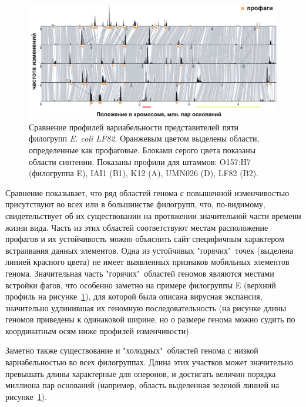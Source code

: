 \begin{figure}[!ht] 
    \center
      \includegraphics[width=\textwidth]{Dissertation/images/complexity/coli_phylogroups_complexity2.png}
    \caption{Сравнение профилей вариабельности представителей пяти филогрупп \textit{E. coli LF82}. Оранжевым цветом выделены области, определенные как профаговые. Блоками серого цвета показаны области синтении. Показаны профили для штаммов: O157:H7 (филогруппа E), IAI1 (B1), K12 (A), UMN026 (D), LF82 (B2). }
    \label{img:phylogroups_complex} 
  \end{figure}
  
  

Сравнение показывает, что ряд областей генома с повышенной изменчивостью присутствуют во всех или в большинстве филогрупп, что, по-видимому, свидетельствует об их существовании на протяжении значительной части времени жизни вида. Часть из этих областей соответствуют местам расположение профагов и их устойчивость можно объяснить сайт специфичным характером встраивания данных элементов. Одна из устойчивых "горячих"\ точек (выделена линией красного цвета) не имеет выявленных признаков мобильных элементов генома. Значительная часть "горячих"\ областей геномов являются местами встройки фагов, что особенно заметно на примере филогруппы E (верхний профиль на рисунке~\ref{img:phylogroups_complex}), для которой была описана вирусная экспансия, значительно удлинившая их геномную последовательность (на рисунке длины геномов приведены к одинаковой ширине, но о размере генома можно судить по координатным осям ниже профилей изменчивости).

Заметно также существование и "холодных"\ областей генома с низкой вариабельностью во всех филогруппах. Длина этих участков может значительно превышать длины характерные для оперонов, и достигать величин порядка миллиона пар оснований (например, область выделенная зеленой линией на рисунке~\ref{img:phylogroups_complex}).

